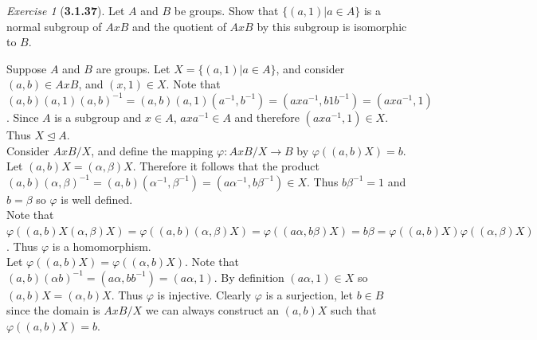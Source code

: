 \documentclass[12pt]{amsart}
\makeatletter
\theoremstyle{remark}
\newtheorem*{exercise}{Exercise}%
\renewenvironment{proof}[1][\proofname]{\par\doublespacing
  \pushQED{\qed}%
  \normalfont \topsep6\p@\@plus6\p@\relax
  \list{}{%
    \settowidth{\leftmargin}{\itshape\proofname:\hskip\labelsep}%
    \setlength{\labelwidth}{0pt}%
    \setlength{\itemindent}{-\leftmargin}%
  }%
  \item[\hskip\labelsep\itshape#1\@addpunct{:}]\ignorespaces
}{%
  \popQED\endlist\@endpefalse
  \singlespacing
}
\theoremstyle{mycomment}
\makeatother
\begin{document}
\begin{exercise}[\textbf{3.1.37}] Let $A$ and $B$ be groups. Show that $\{(a, 1) | a \in A\}$ is a normal subgroup of $AxB$ and the 
  quotient of $A x B$ by this subgroup is isomorphic to $B$. 
  \begin{proof} Suppose $A$ and $B$ are groups. Let $X = \{(a, 1) | a \in A\}$, and consider $(a, b) \in AxB$, and $(x, 1)\in X$. Note that 
    $(a, b)(a, 1)(a, b)^{-1} = (a, b)(a, 1)(a^{-1}, b^{-1}) = (axa^{-1}, b1b^{-1}) = (axa^{-1}, 1)$. Since $A$ is a subgroup and $x \in A$,  
    $axa^{-1} \in A$ and therefore $(axa^{-1}, 1) \in X$. Thus $X \trianglelefteq A$. \\

    Consider $AxB/X$, and define the mapping $\varphi:AxB/X \to B$ by $\varphi((a, b)X) = b$.\\
    Let $(a, b)X = (\alpha, \beta)X$. Therefore it follows that the product $(a, b)(\alpha, \beta)^{-1} = (a, b)(\alpha^{-1}, \beta^{-1}) = (a\alpha^{-1}, b\beta^{-1}) \in X$. Thus $b\beta^{-1} = 1$ and $b = \beta$ so $\varphi$ is well defined.\\
    Note that $\varphi((a, b)X(\alpha, \beta)X) = \varphi((a, b)(\alpha, \beta)X) = \varphi((a\alpha, b\beta)X) = b\beta = \varphi((a, b)X)\varphi((\alpha, \beta)X)$. Thus $\varphi$ is a homomorphism.\\

    Let $\varphi((a, b)X) = \varphi((\alpha, b)X)$. Note that $(a, b)(\alpha b)^{-1} = (a\alpha, bb^{-1}) = (a\alpha, 1)$. By definition $(a\alpha, 1) \in X$ so $(a, b)X = (\alpha, b)X$. Thus $\varphi$ is injective. Clearly $\varphi$ is a surjection, let $b \in B$ since the domain is $AxB/X$ we can always construct an $(a, b)X$ such that $\varphi((a, b)X) = b$. 
  \end{proof}

\end{exercise}
\vspace{.15in}
\end{document}
